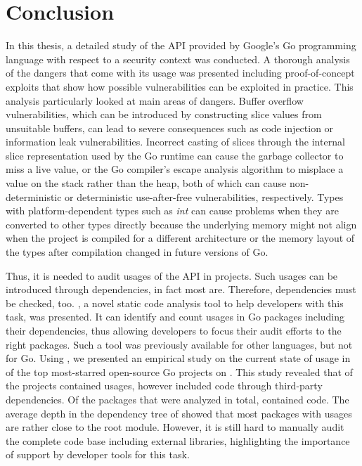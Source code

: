 
\chapter{Conclusion}\label{ch:conclusion}

In this thesis, a detailed study of the \unsafe{} \acrshort{API} provided by Google's Go programming language with
respect to a security context was conducted.
A thorough analysis of the dangers that come with its usage was presented including proof-of-concept exploits that show
how possible vulnerabilities can be exploited in practice.
This analysis particularly looked at  main areas of dangers.
Buffer overflow vulnerabilities, which can be introduced by constructing slice values from unsuitable buffers, can lead
to severe consequences such as code injection or information leak vulnerabilities.
Incorrect casting of slices through the internal slice representation used by the Go runtime can cause the garbage
collector to miss a live value, or the Go compiler's escape analysis algorithm to misplace a value on the stack rather
than the heap, both of which can cause non-deterministic or deterministic use-after-free vulnerabilities, respectively.
Types with platform-dependent types such as \textit{int} can cause problems when they are converted to other types
directly because the underlying memory might not align when the project is compiled for a different architecture or
the memory layout of the types after compilation changed in future versions of Go.

Thus, it is needed to audit usages of the \unsafe{} API in projects.
Such usages can be introduced through dependencies, in fact most are.
Therefore, dependencies must be checked, too.
\toolGeiger{}, a novel static code analysis tool to help developers with this task, was presented.
It can identify and count \unsafe{} usages in Go packages including their dependencies, thus allowing developers to
focus their audit efforts to the right packages.
Such a tool was previously available for other languages, but not for Go.
Using \toolGeiger{}, we presented an empirical study on the current state of \unsafe{} usage in \projsAnalyzed{} of the
top \projsTotal{} most-starred open-source Go projects on \github{}.
This study revealed that \percentageUnsafeProjects{} of the projects contained \unsafe{} usages, however
\percentageUnsafeTransitiveWithDependencies{} included \unsafe{} code through third-party dependencies.
Of the \packagesAnalyzed{} packages that were analyzed in total, \percentageUnsafePackages{} contained \unsafe{} code.
The average depth in the dependency tree of \averageUnsafeImportDepth{} showed that most packages with \unsafe{} usages
are rather close to the root module.
However, it is still hard to manually audit the complete code base including external libraries, highlighting the
importance of support by developer tools for this task.

